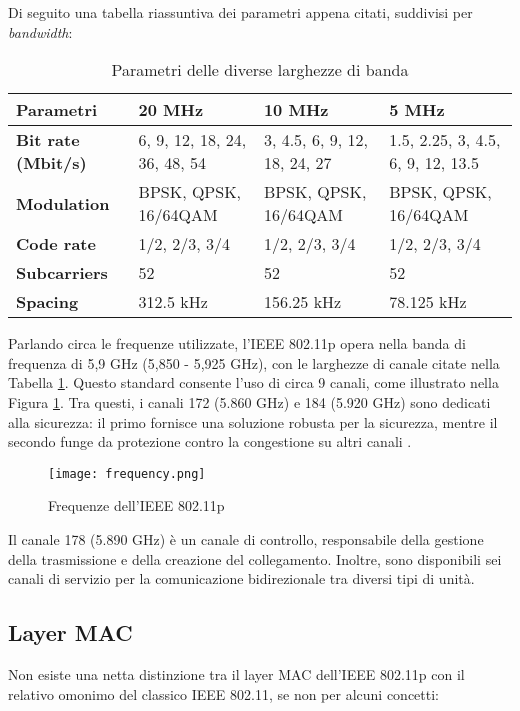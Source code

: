 Di seguito una tabella riassuntiva dei parametri appena citati, suddivisi per \textit{bandwidth}:


\begin{table}[htbp]
    \centering
    \begin{tabular}{|p{7em}|p{7em}|p{7em}|p{7em}|} 
     \hline
     \textbf{Parametri} & \textbf{20 MHz} & \textbf{10 MHz} & \textbf{5 MHz} \\ 
     \hline
     \textbf{Bit rate (Mbit/s)} & 6, 9, 12, 18, 24, 36, 48, 54 & 3, 4.5, 6, 9, 12, 18, 24, 27 & 1.5, 2.25, 3, 4.5, 6, 9, 12, 13.5 \\ 
     \hline
     \textbf{Modulation} & BPSK, QPSK, 16/64QAM & BPSK, QPSK, 16/64QAM & BPSK, QPSK, 16/64QAM \\
     \hline
     \textbf{Code rate} & 1/2, 2/3, 3/4 & 1/2, 2/3, 3/4 & 1/2, 2/3, 3/4 \\
     \hline
     \textbf{Subcarriers} & 52 & 52 & 52 \\
     \hline
     \textbf{Spacing} & 312.5 kHz & 156.25 kHz & 78.125 kHz \\ 
     \hline
    \end{tabular}
    \caption{Parametri delle diverse larghezze di banda}
    \label{table:1}
\end{table}

Parlando circa le frequenze utilizzate, l'IEEE 802.11p opera nella banda di frequenza di 5,9 GHz (5,850 - 5,925 GHz), con le larghezze di canale citate nella Tabella \ref{table:1}. Questo standard consente l'uso di circa 9 canali, come illustrato nella Figura \ref{fig:frequency}. Tra questi, i canali 172 (5.860 GHz) e 184 (5.920 GHz) sono dedicati alla sicurezza: il primo fornisce una soluzione robusta per la sicurezza, mentre il secondo funge da protezione contro la congestione su altri canali \cite{ad_hoc_new}.

\begin{figure}[h!]
    \centering
    \texttt{[image: frequency.png]}
    \caption{Frequenze dell'IEEE 802.11p}
    \label{fig:frequency}
\end{figure}

Il canale 178 (5.890 GHz) è un canale di controllo, responsabile della gestione della trasmissione e della creazione del collegamento. Inoltre, sono disponibili sei canali di servizio per la comunicazione bidirezionale tra diversi tipi di unità.

\subsection[Layer MAC]{Layer MAC}
Non esiste una netta distinzione tra il layer MAC dell'IEEE 802.11p con il relativo omonimo del classico IEEE 802.11, se non per alcuni concetti:

